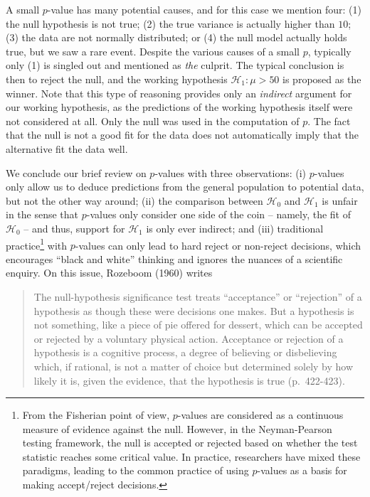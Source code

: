 \documentclass[english,,doc,floatsintext]{apa6}
\let\rmarkdownfootnote\footnote%
\def\footnote{\protect\rmarkdownfootnote}
\begin{document}
A small \(p\)-value has many potential causes, and for this case we mention four: (1) the null hypothesis is not true; (2) the true variance is actually higher than \(10\); (3) the data are not normally distributed; or (4) the null model actually holds true, but we saw a rare event. Despite the various causes of a small \(p\), typically only (1) is singled out and mentioned as \emph{the} culprit. The typical conclusion is then to reject the null, and the working hypothesis \(\mathcal{H}_{1} : \mu > 50\) is proposed as the winner. Note that this type of reasoning provides only an \emph{indirect} argument for our working hypothesis, as the predictions of the working hypothesis itself were not considered at all. Only the null was used in the computation of \(p\). The fact that the null is not a good fit for the data does not automatically imply that the alternative fit the data well.

We conclude our brief review on \(p\)-values with three observations: (i) \(p\)-values only allow us to deduce predictions from the general population to potential data, but not the other way around; (ii) the comparison between \(\mathcal{H}_{0}\) and \(\mathcal{H}_{1}\) is unfair in the sense that \(p\)-values only consider one side of the coin -- namely, the fit of \(\mathcal{H}_{0}\) -- and thus, support for \(\mathcal{H}_1\) is only ever indirect; and (iii) traditional practice\footnote{From the Fisherian point of view, \(p\)-values are considered as a continuous measure of evidence against the null. However, in the Neyman-Pearson testing framework, the null is accepted or rejected based on whether the test statistic reaches some critical value. In practice, researchers have mixed these paradigms, leading to the common practice of using \(p\)-values as a basis for making accept/reject decisions.} with \(p\)-values can only lead to hard reject or non-reject decisions, which encourages \enquote{black and white} thinking and ignores the nuances of a scientific enquiry. On this issue, Rozeboom (1960) writes

\begin{quote}
The null-hypothesis significance test treats \enquote{acceptance} or \enquote{rejection} of a hypothesis as though these were decisions one makes. But a hypothesis is not something, like a piece of pie offered for dessert, which can be accepted or rejected by a voluntary physical action. Acceptance or rejection of a hypothesis is a cognitive process, a degree of believing or disbelieving which, if rational, is not a matter of choice but determined solely by how likely it is, given the evidence, that the hypothesis is true (p.~422-423).
\end{quote}
\end{document}
